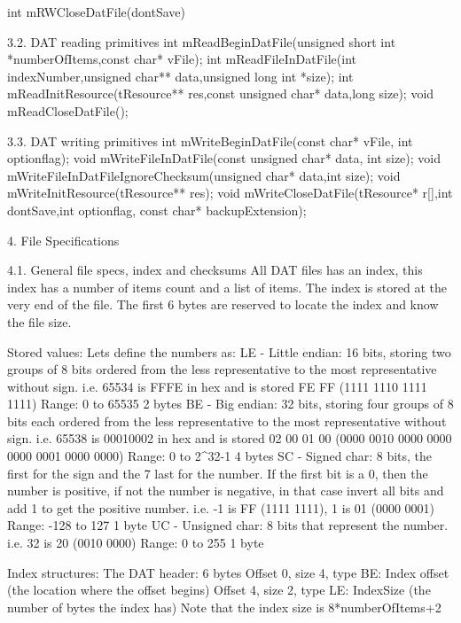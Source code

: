  int mRWCloseDatFile(dontSave)

3.2. DAT reading primitives
 int  mReadBeginDatFile(unsigned short int *numberOfItems,const char* vFile);
 int  mReadFileInDatFile(int indexNumber,unsigned char** data,unsigned long
      int *size);
 int  mReadInitResource(tResource** res,const unsigned char* data,long size);
 void mReadCloseDatFile();

3.3. DAT writing primitives
 int  mWriteBeginDatFile(const char* vFile, int optionflag);
 void mWriteFileInDatFile(const unsigned char* data, int size);
 void mWriteFileInDatFileIgnoreChecksum(unsigned char* data,int size);
 void mWriteInitResource(tResource** res);
 void mWriteCloseDatFile(tResource* r[],int dontSave,int optionflag, const
      char* backupExtension);

4. File Specifications

4.1. General file specs, index and checksums
 All DAT files has an index, this index has a number of items count and
 a list of items.
 The index is stored at the very end of the file.
 The first 6 bytes are reserved to locate the index and know the file size.

 Stored values:
 Lets define the numbers as:
  LE - Little endian: 16 bits, storing two groups of 8 bits ordered from
       the less representative to the most representative without sign.
       i.e. 65534 is FFFE in hex and is stored FE FF (1111 1110 1111 1111)
       Range: 0 to 65535
       2 bytes
  BE - Big endian: 32 bits, storing four groups of 8 bits each ordered from
       the less representative to the most representative without sign.
       i.e. 65538 is 00010002 in hex and is stored 02 00 01 00
       (0000 0010 0000 0000 0000 0001 0000 0000)
       Range: 0 to 2^32-1
       4 bytes
  SC - Signed char: 8 bits, the first for the sign and the 7 last for the
       number. If the first bit is a 0, then the number is positive, if not
       the number is negative, in that case invert all bits and add 1 to
       get the positive number.
       i.e. -1 is FF (1111 1111), 1 is 01 (0000 0001)
       Range: -128 to 127
       1 byte
  UC - Unsigned char: 8 bits that represent the number.
       i.e. 32 is 20 (0010 0000)
       Range: 0 to 255
       1 byte

 Index structures:
 The DAT header: 6 bytes
  Offset 0, size 4, type BE: Index offset (the location where the offset
                             begins)
  Offset 4, size 2, type LE: IndexSize (the number of bytes the index has)
                             Note that the index size is 8*numberOfItems+2

